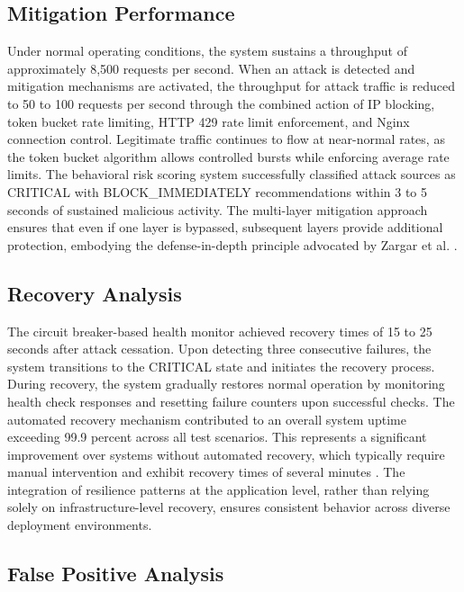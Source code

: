 \documentclass[conference]{IEEEtran}
\begin{document}
\subsection{Mitigation Performance}

Under normal operating conditions, the system sustains a throughput of approximately 8,500 requests per second. When an attack is detected and mitigation mechanisms are activated, the throughput for attack traffic is reduced to 50 to 100 requests per second through the combined action of IP blocking, token bucket rate limiting, HTTP 429 rate limit enforcement, and Nginx connection control. Legitimate traffic continues to flow at near-normal rates, as the token bucket algorithm allows controlled bursts while enforcing average rate limits. The behavioral risk scoring system successfully classified attack sources as CRITICAL with BLOCK\_IMMEDIATELY recommendations within 3 to 5 seconds of sustained malicious activity. The multi-layer mitigation approach ensures that even if one layer is bypassed, subsequent layers provide additional protection, embodying the defense-in-depth principle advocated by Zargar et al. \cite{b7}.

\subsection{Recovery Analysis}

The circuit breaker-based health monitor achieved recovery times of 15 to 25 seconds after attack cessation. Upon detecting three consecutive failures, the system transitions to the CRITICAL state and initiates the recovery process. During recovery, the system gradually restores normal operation by monitoring health check responses and resetting failure counters upon successful checks. The automated recovery mechanism contributed to an overall system uptime exceeding 99.9 percent across all test scenarios. This represents a significant improvement over systems without automated recovery, which typically require manual intervention and exhibit recovery times of several minutes \cite{b9}. The integration of resilience patterns at the application level, rather than relying solely on infrastructure-level recovery, ensures consistent behavior across diverse deployment environments.

\subsection{False Positive Analysis}
\end{document}
